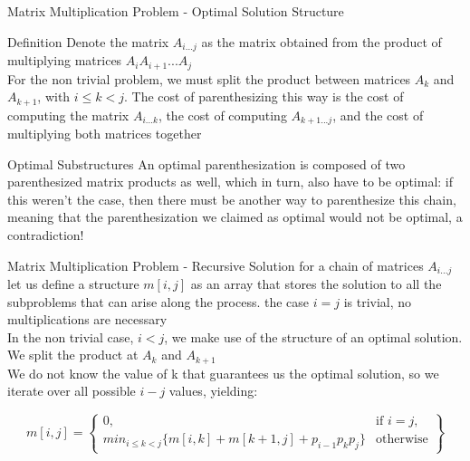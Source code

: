 \begin{frame}{Matrix Multiplication Problem - Optimal Solution Structure}
  \begin{block}{Definition}
   Denote the matrix $A_{i...j}$ as the matrix obtained from the product
   of multiplying matrices $A_{i}A_{i+1}...A_{j}$ \\
  \vspace{0.5em}
  For the non trivial problem, we must split the product between matrices $A_k$ and $A_{k+1}$,
  with $ i \leq k < j$. The cost of parenthesizing this way is the cost
  of computing the matrix $A_{i...k}$, the cost of computing $A_{k+1...j}$,
  and the cost of multiplying both matrices together
  \end{block}

  \pause
  \begin{alertblock}{Optimal Substructures}
    An optimal parenthesization is composed of two parenthesized matrix products as well,
    which in turn, also have to be optimal: if this weren't the case, then there must be another
    way to parenthesize this chain, meaning that the parenthesization we claimed as optimal would not
    be optimal, a contradiction!
  \end{alertblock}
\end{frame}

\begin{frame}{Matrix Multiplication Problem - Recursive Solution}
  for a chain of matrices $A_{i...j}$ let us define a structure $m[i, j]$ as an array
  that stores the solution to all the subproblems that can arise
  along the process.
  \vspace{0.5em}
  the case $i = j$ is trivial, no multiplications are necessary %
  \\
  In the non trivial case, $i < j$, we make use of the structure of an optimal solution.
  We split the product at  $A_k$ and $A_{k+1}$
  \vspace{0.5em}
  \\
  We do not know the value of k that guarantees us the optimal solution, so we iterate over
  all possible $i - j$ values, yielding:   

  \[
  m[i,j] = \left\{\begin{array}{lr}
    0, & \text{if } i = j,\\
    min_{i \leq k < j} \{m[i,k] + m[k + 1, j] + p_{i-1}p_{k}p_{j}\} & \text{otherwise}
    \end{array}\right\}
  \]
\end{frame}

